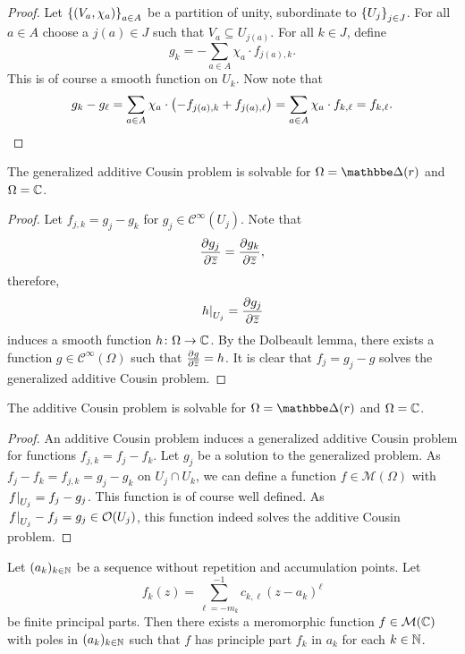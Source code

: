 \begin{proof}
Let $\left\{(V_a, \chi_a)\right\}_{a \in A}$ be a partition of unity,
subordinate to $\left\{U_j\right\}_{j \in J}$. For all $a \in A$ choose a
$j(a) \in J$ such that $V_a \subseteq U_{j(a)}$. For all $k \in J$,
define
\[
g_k = -\sum_{a \in A} \chi_a \cdot f_{j(a), k}.
\]
This is of course a smooth function on $U_k$. Now note that
\[
g_k - g_\ell =
\sum_{a \in A} \chi_a \cdot \left(-f_{j(a),k} + f_{j(a),\ell}\right) =
\sum_{a \in A} \chi_a \cdot f_{k, \ell} =
f_{k, \ell}. \qedhere
\]
\end{proof}

\begin{trditev}
The generalized additive Cousin problem is solvable for
$\Omega = \dsk(r)$ and $\Omega = \mathbb{C}$.
\end{trditev}

\begin{proof}
Let $f_{j,k} = g_j - g_k$ for $g_j \in \mathcal{C}^\infty(U_j)$.
Note that
\[
\frac{\partial g_j}{\partial \overline{z}} = \frac{\partial g_k}{\partial \overline{z}},
\]
therefore,
\[
\left. h\right|_{U_j}^{} = \frac{\partial g_j}{\partial \overline{z}}
\]
induces a smooth function $h \colon \Omega \to \mathbb{C}$. By the
Dolbeault lemma, there exists a function
$g \in \mathcal{C}^\infty(\Omega)$ such that
$\frac{\partial g}{\partial \overline{z}} = h$. It is clear that $f_j = g_j - g$ solves
the generalized additive Cousin problem.
\end{proof}

\begin{trditev}
The additive Cousin problem is solvable for $\Omega = \dsk(r)$ and
$\Omega = \mathbb{C}$.
\end{trditev}

\begin{proof}
An additive Cousin problem induces a generalized additive Cousin
problem for functions $f_{j,k} = f_j - f_k$. Let $g_j$ be a
solution to the generalized problem. As
$f_j - f_k = f_{j,k} = g_j - g_k$ on $U_j \cap U_k$, we can define
a function $f \in \mathcal{M}(\Omega)$ with
$\left. f\right|_{U_j}^{} = f_j - g_j$. This function is of course well
defined. As $\left. f\right|_{U_j}^{} - f_j = g_j \in \mathcal{O}(U_j)$,
this function indeed solves the additive Cousin problem.
\end{proof}

\begin{izrek}
Let $(a_k)_{k \in \mathbb{N}}$ be a sequence without repetition and
accumulation points. Let
\[
f_k(z) = \sum_{\ell = -m_k}^{-1} c_{k,\ell} (z-a_k)^\ell
\]
be finite principal parts. Then there exists a meromorphic function
$f \in \mathcal{M}(\mathbb{C})$ with poles in $(a_k)_{k \in \mathbb{N}}$ such that
$f$ has principle part $f_k$ in $a_k$ for each $k \in \mathbb{N}$.
\end{izrek}


